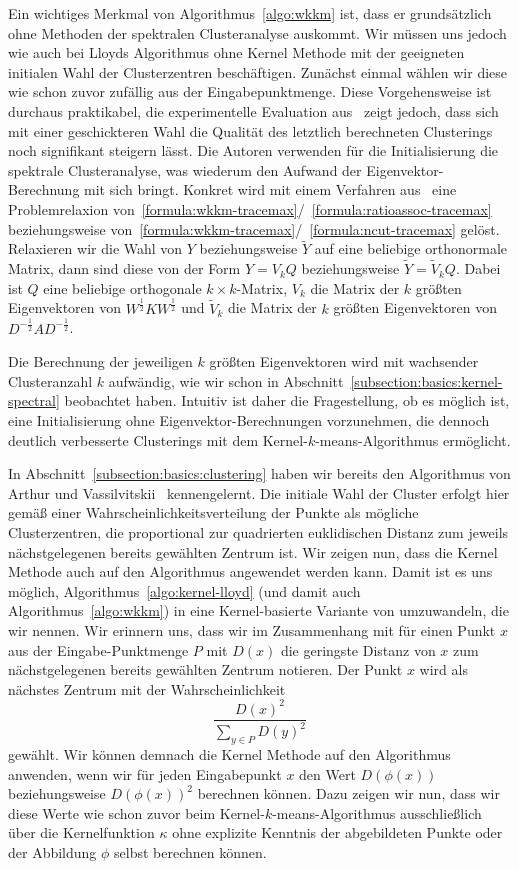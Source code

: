 Ein wichtiges Merkmal von Algorithmus~\ref{algo:wkkm} ist, dass er grundsätzlich ohne Methoden der spektralen Clusteranalyse
auskommt. Wir müssen uns jedoch wie auch bei Lloyds Algorithmus ohne Kernel Methode mit der geeigneten initialen Wahl
der Clusterzentren beschäftigen. Zunächst einmal wählen wir diese wie schon zuvor zufällig aus der Eingabepunktmenge.
Diese Vorgehensweise ist durchaus praktikabel, die experimentelle Evaluation aus~\citep{DhillonGK04,DhillonGK07} zeigt jedoch,
dass sich mit einer geschickteren Wahl die Qualität des letztlich berechneten Clusterings noch signifikant steigern lässt.
Die Autoren verwenden für die Initialisierung die spektrale Clusteranalyse, was wiederum den Aufwand der Eigenvektor-Berechnung
mit sich bringt.
\absatz
Konkret wird mit einem Verfahren aus~\cite{GolubL96} eine Problemrelaxion
von~\ref{formula:wkkm-tracemax}/~\ref{formula:ratioassoc-tracemax} beziehungsweise
von~\ref{formula:wkkm-tracemax}/~\ref{formula:ncut-tracemax} gelöst.
Relaxieren wir die Wahl von $Y$ beziehungsweise $\tilde{Y}$ auf eine beliebige
orthonormale Matrix, dann sind diese von der Form $Y = V_k Q$ beziehungsweise $\tilde{Y} = \tilde{V}_k Q$.
Dabei ist $Q$ eine beliebige orthogonale $k \times k$-Matrix, $V_k$ die Matrix der $k$ größten Eigenvektoren von
$W^{\frac{1}{2}} K W^{\frac{1}{2}}$ und $\tilde{V}_k$ die Matrix der $k$ größten Eigenvektoren von
$D^{-\frac{1}{2}} A D^{-\frac{1}{2}}$.

Die Berechnung der jeweiligen $k$ größten Eigenvektoren wird mit wachsender Clusteranzahl
$k$ aufwändig, wie wir schon in Abschnitt~\ref{subsection:basics:kernel-spectral} beobachtet haben.
Intuitiv ist daher die Fragestellung, ob es möglich ist, eine Initialisierung ohne Eigenvektor-Berechnungen vorzunehmen,
die dennoch deutlich verbesserte Clusterings mit dem Kernel-$k$-means-Algorithmus ermöglicht.

In Abschnitt~\ref{subsection:basics:clustering} haben wir bereits den Algorithmus \kmpp{} von Arthur und
Vassilvitskii~\cite{ArthurV07} kennengelernt. Die initiale Wahl der Cluster erfolgt hier gemäß einer
Wahrscheinlichkeitsverteilung der Punkte als mögliche Clusterzentren, die proportional zur quadrierten euklidischen Distanz
zum jeweils nächstgelegenen bereits gewählten Zentrum ist. Wir zeigen nun, dass die Kernel Methode auch auf den Algorithmus
\kmpp{} angewendet werden kann. Damit ist es uns möglich, Algorithmus~\ref{algo:kernel-lloyd} (und damit
auch Algorithmus~\ref{algo:wkkm}) in eine Kernel-basierte Variante von \kmpp{} umzuwandeln, die wir \kkmpp{} nennen.
\absatz
Wir erinnern uns, dass wir im Zusammenhang mit \kmpp{} für einen Punkt $x$ aus der Eingabe-Punktmenge $P$ mit $D(x)$
die geringste Distanz von $x$ zum nächstgelegenen bereits gewählten Zentrum notieren. Der Punkt $x$ wird als nächstes
Zentrum mit der Wahrscheinlichkeit
\[ \frac{D(x)^2}{\sum_{y \in P} D(y)^2} \]
gewählt. Wir können demnach die Kernel Methode auf den Algorithmus \kmpp{} anwenden, wenn wir für jeden Eingabepunkt $x$ den
Wert $D(\phi(x))$ beziehungsweise $D(\phi(x))^2$ berechnen können. Dazu zeigen wir nun, dass wir diese Werte wie schon zuvor
beim Kernel-$k$-means-Algorithmus ausschließlich über die Kernelfunktion $\kappa$ ohne explizite Kenntnis der abgebildeten
Punkte oder der Abbildung $\phi$ selbst berechnen können.

